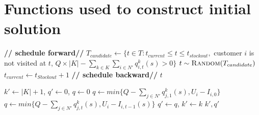 \documentclass{article}
\begin{document}
\appendix

\section{Functions used to construct initial solution}

\begin{algorithm}[H]
\captionsetup{labelformat=empty}
\caption{\textbf{Find Feasible Visit Time}($t_{current}$, $t_{Stockout}$, $i$)}
\label{alg:FindVisitTime}
\begin{algorithmic}[1]
        \STATE \textbf{// schedule forward//}
        \STATE $T_{candidate}\gets\{t\in T:  t_{current}\leq t \leq t_{stockout},$
        \STATE \hspace{9em}  customer $i$ is not visited at $t$, 
        \STATE \hspace{9em}  $Q\times |K| - \sum_{k\in K}\sum_{i\in N'} q^k_{i,t}(s) > 0\}$
        \RETURN $t \sim \textsc{Random}(T_{candidate})$
        \ELSE
            \STATE $t_{current} \gets t_{Stockout} +1$
        \ENDIF
    \ELSE
        \STATE \textbf{// schedule backward//}         
                        \RETURN $t$
                    \ENDIF
                \ENDIF
            \ENDFOR
    \ENDIF
\ENDWHILE
\end{algorithmic}
\end{algorithm}




\begin{algorithm}[H]
\captionsetup{labelformat=empty}
\caption{\textbf{Find Vehicle To Deliver Max}($t$, $i$, $s$)}
\label{alg:FindVehicleToDeliverMax}
\begin{algorithmic}[1]
\STATE $k'\gets |K|+1$, $q'\gets 0$, 
    \STATE $q\gets 0$
        \STATE $q\gets min\{Q-\sum_{j\in N'}q^k_{j,1}(s), U_{i} - I_{i,0}\}$    
    \ELSE
        \STATE $q\gets min\{Q-\sum_{j\in N'}q^k_{j,t}(s), U_{i} - I_{i,t-1}(s)\}$
    \ENDIF
        \STATE $q' \gets q$, $k'\gets k$
    \ENDIF
\ENDFOR
\RETURN $k',q'$
\end{algorithmic}
\end{algorithm}
\end{document}
